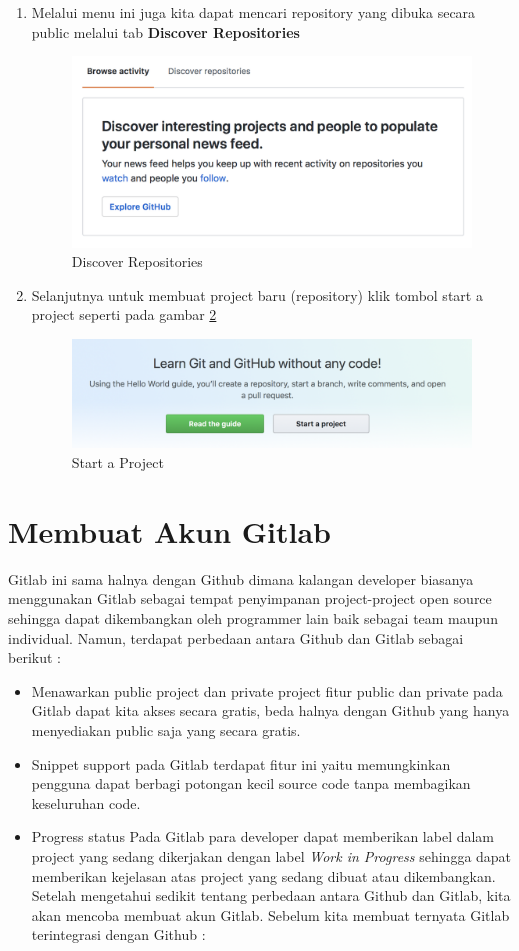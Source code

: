 \begin{enumerate}
\item Melalui menu ini juga kita dapat mencari repository yang dibuka secara public melalui tab \textbf{Discover Repositories}
\begin{figure}[!htbp]
\centerline{\includegraphics[width=.75\textwidth]{Figures/akunGit/7.PNG}}
\caption{Discover Repositories}
\label{7}
\end{figure} 
\item Selanjutnya untuk membuat project baru (repository) klik tombol start a project seperti pada gambar \ref{8}
\begin{figure}[!htbp]
\centerline{\includegraphics[width=.75\textwidth]{Figures/akunGit/8.PNG}}
\caption{Start a Project}
\label{8}
\end{figure} 
\end{enumerate}

\section{Membuat Akun Gitlab}
Gitlab ini sama halnya dengan Github dimana kalangan developer biasanya menggunakan Gitlab sebagai tempat penyimpanan project-project open source sehingga dapat dikembangkan oleh programmer lain baik sebagai team maupun individual. Namun, terdapat perbedaan antara Github dan Gitlab sebagai berikut :
\begin{itemize}
\item Menawarkan public project dan private project
\subitem fitur public dan private pada Gitlab dapat kita akses secara gratis, beda halnya dengan Github yang hanya menyediakan public saja yang secara gratis.
\item Snippet support 
\subitem pada Gitlab terdapat fitur ini yaitu memungkinkan pengguna dapat berbagi potongan kecil source code tanpa membagikan keseluruhan code.
\item Progress status
\subitem Pada Gitlab para developer dapat memberikan label dalam project yang sedang dikerjakan dengan label \textit{Work in Progress} sehingga dapat memberikan kejelasan atas project yang sedang dibuat atau dikembangkan.
	Setelah mengetahui sedikit tentang perbedaan antara Github dan Gitlab, kita akan mencoba membuat akun Gitlab. Sebelum kita membuat ternyata Gitlab terintegrasi dengan Github :
\end{itemize}

